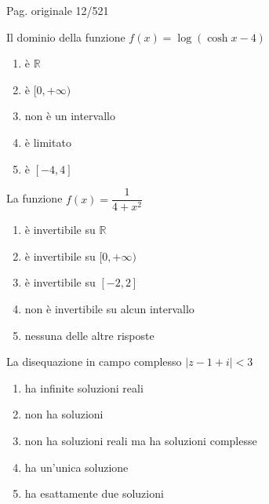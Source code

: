 
\par\noindent\hfill{\color{cyan!65!black}\scriptsize Pag. originale 12/521}\par\smallskip

\begin{quiz}
Il dominio della funzione $f(x)=\log(\cosh x-4)$
\begin{enumerate}[label=\alph*),leftmargin=1.3cm,itemsep=3pt,topsep=5pt]
\item \`e $\mathbb R$
\item \`e $[0,+\infty)$
\item non \`e un intervallo
\item \`e limitato
\item \`e $[-4,4]$
\end{enumerate}
\end{quiz}

\begin{quiz}
La funzione $f(x)=\dfrac1{4+x^2}$
\begin{enumerate}[label=\alph*),leftmargin=1.3cm,itemsep=3pt,topsep=5pt]
\item \`e invertibile su $\mathbb R$
\item \`e invertibile su $[0,+\infty)$
\item \`e invertibile su $[-2,2]$
\item non \`e invertibile su alcun intervallo
\item nessuna delle altre risposte
\end{enumerate}
\end{quiz}

\begin{quiz}
La disequazione in campo complesso $|z-1+i|<3$
\begin{enumerate}[label=\alph*),leftmargin=1.3cm,itemsep=3pt,topsep=5pt]
\item ha infinite soluzioni reali
\item non ha soluzioni
\item non ha soluzioni reali ma ha soluzioni complesse
\item ha un'unica soluzione
\item ha esattamente due soluzioni
\end{enumerate}
\end{quiz}

